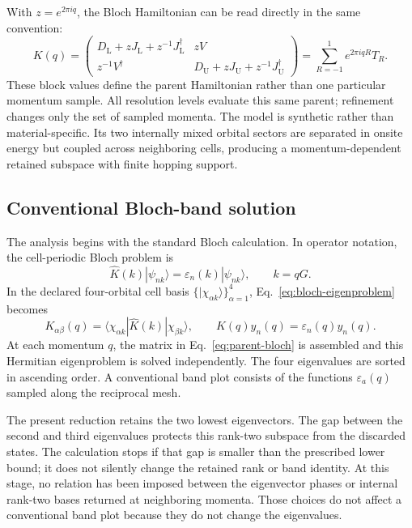 \documentclass[11pt]{article}
\begin{document}
With $z=e^{2\pi iq}$, the Bloch Hamiltonian can be read directly in the same convention:
\begin{equation}
 K(q)=
 \begin{pmatrix}
 D_{\mathrm L}+zJ_{\mathrm L}+z^{-1}J_{\mathrm L}^\dagger & zV\\
 z^{-1}V^\dagger & D_{\mathrm U}+zJ_{\mathrm U}+z^{-1}J_{\mathrm U}^\dagger
 \end{pmatrix}
 =\sum_{R=-1}^{1}e^{2\pi iqR}T_R.
 \label{eq:parent-bloch}
\end{equation}
These block values define the parent Hamiltonian rather than one particular momentum
sample. All resolution levels evaluate this same parent; refinement changes only the
set of sampled momenta. The model is synthetic rather than material-specific. Its two
internally mixed orbital sectors are separated in onsite energy but coupled across
neighboring cells, producing a momentum-dependent retained subspace with finite hopping
support.

\subsection{Conventional Bloch-band solution}
\label{sec:conventional-bloch}

The analysis begins with the standard Bloch calculation. In operator notation, the
cell-periodic Bloch problem is
\begin{equation}
 \widehat K(k)|\psi_{nk}\rangle=\varepsilon_n(k)|\psi_{nk}\rangle,
 \qquad k=qG.
 \label{eq:bloch-eigenproblem}
\end{equation}
In the declared four-orbital cell basis $\{|\chi_{\alpha k}\rangle\}_{\alpha=1}^4$,
Eq.~\eqref{eq:bloch-eigenproblem} becomes
\begin{equation}
 K_{\alpha\beta}(q)
 =\langle\chi_{\alpha k}|\widehat K(k)|\chi_{\beta k}\rangle,
 \qquad
 K(q)y_n(q)=\varepsilon_n(q)y_n(q).
 \label{eq:bloch-matrix-representation}
\end{equation}
At each momentum $q$, the matrix in Eq.~\eqref{eq:parent-bloch} is assembled and this
Hermitian eigenproblem is solved independently. The four eigenvalues are sorted in
ascending order. A
conventional band plot consists of the functions $\varepsilon_a(q)$ sampled along the
reciprocal mesh.

The present reduction retains the two lowest eigenvectors. The gap between the second
and third eigenvalues protects this rank-two subspace from the discarded states. The
calculation stops if that gap is smaller than the prescribed lower bound; it does not
silently change the retained rank or band identity. At this stage, no relation has been
imposed between the eigenvector phases or internal rank-two bases returned at neighboring
momenta. Those choices do not affect a conventional band plot because they do not change
the eigenvalues.
\end{document}
